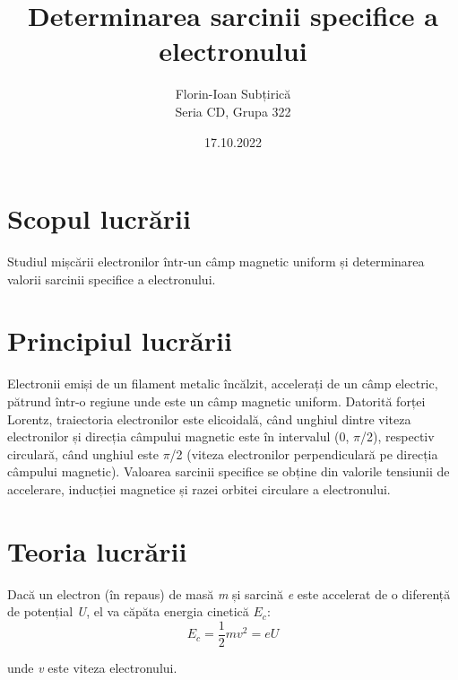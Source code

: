 \documentclass{article}
\title          {Determinarea sarcinii specifice a electronului}
\author         {Florin-Ioan Subțirică \\ Seria CD, Grupa 322}
\date           {17.10.2022}
\begin{document}
\maketitle
\thispagestyle{empty} %
\pagebreak

\tableofcontents
\thispagestyle{empty}
\pagebreak

\section        {Scopul lucrării}

    \makebox[1cm]{} Studiul mișcării electronilor într-un câmp magnetic uniform și determinarea
    valorii sarcinii specifice a electronului.

\section        {Principiul lucrării}

    \makebox[1cm]{} Electronii emiși de un filament metalic încălzit, accelerați de un câmp electric,
    pătrund într-o regiune unde este un câmp magnetic uniform. Datorită forței Lorentz,
    traiectoria electronilor este elicoidală, când unghiul dintre viteza electronilor
    și direcția câmpului magnetic este în intervalul (0, $\pi$/2), respectiv circulară,
    când unghiul este $\pi$/2 (viteza electronilor perpendiculară pe direcția câmpului magnetic).
    Valoarea sarcinii specifice se obține din valorile tensiunii de accelerare, inducției magnetice
    și razei orbitei circulare a electronului.

\section        {Teoria lucrării}

    \makebox[1cm]{} Dacă un electron (în repaus) de masă \textit{m} și sarcină \textit{e}
    este accelerat de o diferență de potențial \textit{U}, el va căpăta 
    energia cinetică \textit{${E}{_c}$}:
\begin{equation}
    {E}{_c} = \frac{1}{2}mv^2 = eU
\end{equation}
\raggedright
    unde \textit{v} este viteza electronului.
\end{document}
